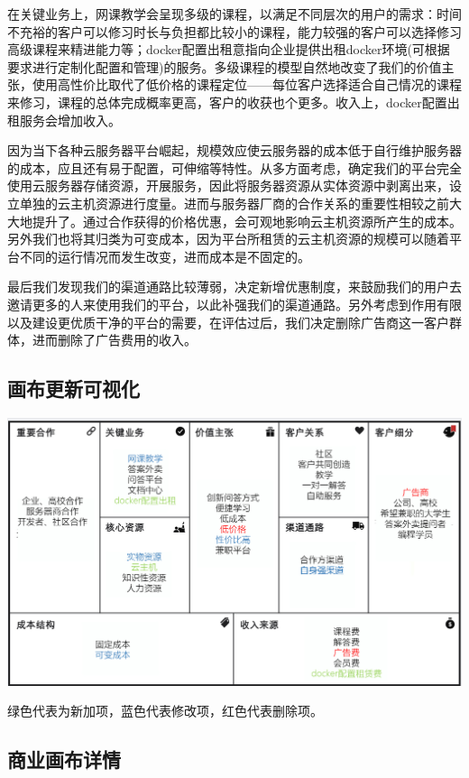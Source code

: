 \documentclass[a4paper]{ctexart}
\begin{document}
在关键业务上，网课教学会呈现多级的课程，以满足不同层次的用户的需求：时间不充裕的客户可以修习时长与负担都比较小的课程，能力较强的客户可以选择修习高级课程来精进能力等；docker配置出租意指向企业提供出租docker环境(可根据要求进行定制化配置和管理)的服务。多级课程的模型自然地改变了我们的价值主张，使用高性价比取代了低价格的课程定位——每位客户选择适合自己情况的课程来修习，课程的总体完成概率更高，客户的收获也个更多。收入上，docker配置出租服务会增加收入。

因为当下各种云服务器平台崛起，规模效应使云服务器的成本低于自行维护服务器的成本，应且还有易于配置，可伸缩等特性。从多方面考虑，确定我们的平台完全使用云服务器存储资源，开展服务，因此将服务器资源从实体资源中剥离出来，设立单独的云主机资源进行度量。进而与服务器厂商的合作关系的重要性相较之前大大地提升了。通过合作获得的价格优惠，会可观地影响云主机资源所产生的成本。另外我们也将其归类为可变成本，因为平台所租赁的云主机资源的规模可以随着平台不同的运行情况而发生改变，进而成本是不固定的。

最后我们发现我们的渠道通路比较薄弱，决定新增优惠制度，来鼓励我们的用户去邀请更多的人来使用我们的平台，以此补强我们的渠道通路。另外考虑到作用有限以及建设更优质干净的平台的需要，在评估过后，我们决定删除广告商这一客户群体，进而删除了广告费用的收入。

\subsection{画布更新可视化}
\begin{center}
  \includegraphics[scale=0.55]{更新后的画布.png}
\end{center}

绿色代表为新加项，蓝色代表修改项，红色代表删除项。

\subsection{商业画布详情}
\end{document}
